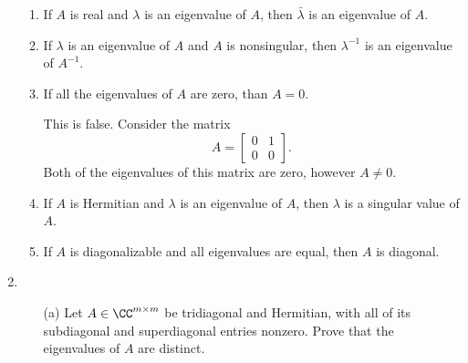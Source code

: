 \documentclass[11pt]{article}
\begin{document}
\begin{enumerate}
\begin{enumerate}
            \item
                If $A$ is real and $\lambda$ is an eigenvalue of $A$, then
                $\bar{\lambda}$ is an eigenvalue of $A$.

            \item
                If $\lambda$ is an eigenvalue of $A$ and $A$ is nonsingular, then
                $\lambda^{-1}$ is an eigenvalue of $A^{-1}$.

            \item %
                If all the eigenvalues of $A$ are zero, than $A = 0$.

                This is false.
                Consider the matrix
                \[
                    A =
                    \begin{bmatrix}
                        0 & 1 \\
                        0 & 0
                    \end{bmatrix}.
                \]
                Both of the eigenvalues of this matrix are zero, however
                $A \neq 0$.

            \item
                If $A$ is Hermitian and $\lambda$ is an eigenvalue of $A$, then
                $\lambda$ is a singular value of $A$.

            \item
                If $A$ is diagonalizable and all eigenvalues are equal, then $A$
                is diagonal.
        \end{enumerate}

    \item %
        \begin{enumerate}
            \item[(a)] %
                Let $A \in \CC^{m \times m}$ be tridiagonal and Hermitian, with
                all of its subdiagonal and superdiagonal entries nonzero.
                Prove that the eigenvalues of $A$ are distinct.



\end{enumerate}
\end{enumerate}
\end{document}
